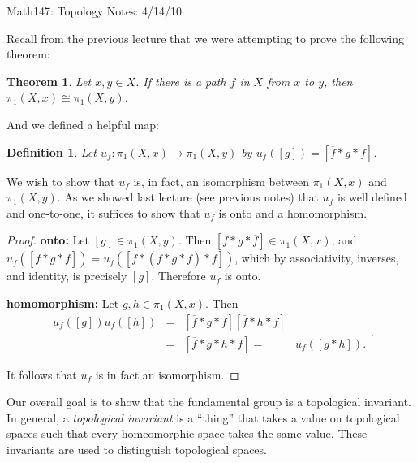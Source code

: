 \documentclass[11pt,letterpaper,boxed]{article}
\newtheorem*{defn}{Definition}
\newtheorem*{theorem}{Theorem}
\begin{document}
Math147: Topology Notes: 4/14/10\\

\begin{center}{\Large }
\end{center}
\normalsize
\vspace{.2in}

Recall from the previous lecture that we were attempting to prove the following theorem:
\begin{theorem}
Let $x,y\in X$.  If there is a path $f$ in $X$ from $x$ to $y$, then $\pi_1(X,x)\cong \pi_1(X,y)$.
\end{theorem}

And we defined a helpful map:
\begin{defn} Let $u_f:\pi_1(X,x)\to \pi_1(X,y)$ by $u_f([g])=[\overline{f}*g*f]$.
\end{defn}

We wish to show that $u_f$ is, in fact, an isomorphism between $\pi_1(X,x)$ and $\pi_1(X,y).$  As we showed last lecture (see previous notes) that $u_f$ is well defined and one-to-one, it suffices to show that $u_f$ is onto and a homomorphism.
\vspace{.2in}

\begin{proof}

\vspace{.1in}

{\bf onto:}
Let $[g]\in \pi_1(X,y)$.  Then $[f*g*\overline{f}]\in \pi_1(X,x)$, and $u_f([f*g*\overline{f}])=u_f([\overline{f}*(f*g*\overline{f})*f])$, which by associativity, inverses, and identity, is precisely $[g]$.  Therefore $u_f$ is onto.
\vspace{.2in}

{\bf homomorphism:}
Let $g,h\in \pi_1(X,x)$.  Then \[\begin{array}{cccc} u_f([g])u_f([h])& =& [\overline{f}*g*f][\overline{f}*h*f] & \\ & = & [\overline{f}*g*h*f] =& u_f([g*h]).\end{array}.\]

It follows that $u_f$ is in fact an isomorphism.
\end{proof}


Our overall goal is to show that the fundamental group is a topological invariant.  In general, a 
\emph{topological invariant} is a ``thing'' that takes a value on topological spaces such that every homeomorphic space takes the same value.  These invariants are used to distinguish topological spaces.
\end{document}
